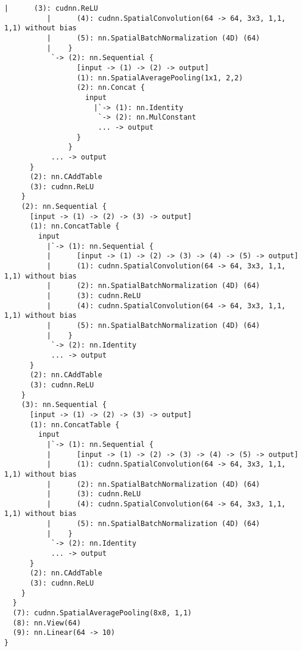 \begin{lstlisting}[language={[5.2]Lua}]
          |      (3): cudnn.ReLU
          |      (4): cudnn.SpatialConvolution(64 -> 64, 3x3, 1,1, 1,1) without bias
          |      (5): nn.SpatialBatchNormalization (4D) (64)
          |    }
           `-> (2): nn.Sequential {
                 [input -> (1) -> (2) -> output]
                 (1): nn.SpatialAveragePooling(1x1, 2,2)
                 (2): nn.Concat {
                   input
                     |`-> (1): nn.Identity
                      `-> (2): nn.MulConstant
                      ... -> output
                 }
               }
           ... -> output
      }
      (2): nn.CAddTable
      (3): cudnn.ReLU
    }
    (2): nn.Sequential {
      [input -> (1) -> (2) -> (3) -> output]
      (1): nn.ConcatTable {
        input
          |`-> (1): nn.Sequential {
          |      [input -> (1) -> (2) -> (3) -> (4) -> (5) -> output]
          |      (1): cudnn.SpatialConvolution(64 -> 64, 3x3, 1,1, 1,1) without bias
          |      (2): nn.SpatialBatchNormalization (4D) (64)
          |      (3): cudnn.ReLU
          |      (4): cudnn.SpatialConvolution(64 -> 64, 3x3, 1,1, 1,1) without bias
          |      (5): nn.SpatialBatchNormalization (4D) (64)
          |    }
           `-> (2): nn.Identity
           ... -> output
      }
      (2): nn.CAddTable
      (3): cudnn.ReLU
    }
    (3): nn.Sequential {
      [input -> (1) -> (2) -> (3) -> output]
      (1): nn.ConcatTable {
        input
          |`-> (1): nn.Sequential {
          |      [input -> (1) -> (2) -> (3) -> (4) -> (5) -> output]
          |      (1): cudnn.SpatialConvolution(64 -> 64, 3x3, 1,1, 1,1) without bias
          |      (2): nn.SpatialBatchNormalization (4D) (64)
          |      (3): cudnn.ReLU
          |      (4): cudnn.SpatialConvolution(64 -> 64, 3x3, 1,1, 1,1) without bias
          |      (5): nn.SpatialBatchNormalization (4D) (64)
          |    }
           `-> (2): nn.Identity
           ... -> output
      }
      (2): nn.CAddTable
      (3): cudnn.ReLU
    }
  }
  (7): cudnn.SpatialAveragePooling(8x8, 1,1)
  (8): nn.View(64)
  (9): nn.Linear(64 -> 10)
}

\end{lstlisting}